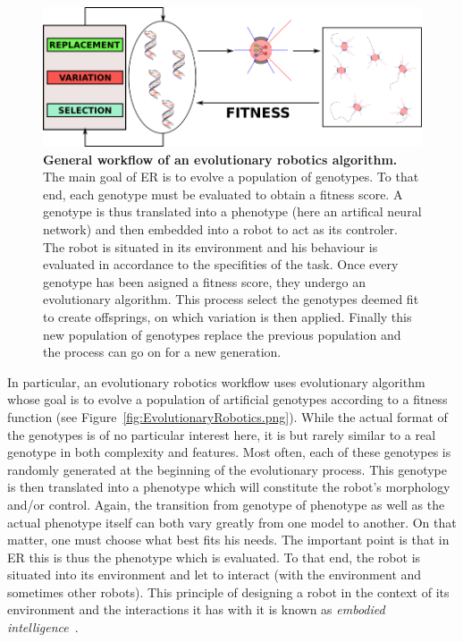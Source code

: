     \begin{figure}[hbtp]
        \begin{center}
          \includegraphics[scale = 0.30]{fig/Intro/EvolutionaryRobotics.png}
          \caption{\textbf{General workflow of an evolutionary robotics algorithm.}
          The main goal of ER is to evolve a population of genotypes. To that end, each genotype must be evaluated to obtain a fitness score. A genotype is thus translated into a phenotype (here an artifical neural network) and then embedded into a robot to act as its controler. The robot is situated in its environment and his behaviour is evaluated in accordance to the specifities of the task. Once every genotype has been asigned a fitness score, they undergo an evolutionary algorithm. This process select the genotypes deemed fit to create offsprings, on which variation is then applied. Finally this new population of genotypes replace the previous population and the process can go on for a new generation.} 
          \label{fig:EvolutionaryRobotics}
        \end{center}
    \end{figure}

    In particular, an evolutionary robotics workflow uses evolutionary algorithm whose goal is to evolve a population of artificial genotypes according to a fitness function (see Figure~\ref{fig:EvolutionaryRobotics.png}). While the actual format of the genotypes is of no particular interest here, it is but rarely similar to a real genotype in both complexity and features. Most often, each of these genotypes is randomly generated at the beginning of the evolutionary process. This genotype is then translated into a phenotype which will constitute the robot's morphology and/or control. Again, the transition from genotype of phenotype as well as the actual phenotype itself can both vary greatly from one model to another. On that matter, one must choose what best fits his needs. The important point is that in ER this is thus the phenotype which is evaluated. To that end, the robot is situated into its environment and let to interact (with the environment and sometimes other robots). This principle of designing a robot in the context of its environment and the interactions it has with it is known as \emph{embodied intelligence}~\parencite{Pfeifer2007}.
    

